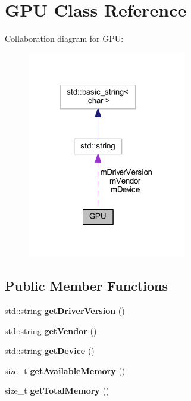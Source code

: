 \hypertarget{class_g_p_u}{}\section{G\+PU Class Reference}
\label{class_g_p_u}


Collaboration diagram for G\+PU\+:
\nopagebreak
\begin{figure}[H]
\begin{center}
\leavevmode
\includegraphics[width=197pt]{class_g_p_u__coll__graph}
\end{center}
\end{figure}
\subsection*{Public Member Functions}
\begin{DoxyCompactItemize}
\item 
std\+::string {\bfseries get\+Driver\+Version} ()\hypertarget{class_g_p_u_ae92cd8553e3017952372f0d9a0a0a6aa}{}\label{class_g_p_u_ae92cd8553e3017952372f0d9a0a0a6aa}

\item 
std\+::string {\bfseries get\+Vendor} ()\hypertarget{class_g_p_u_a7f302d02f8828a87659706ac6ea7e2ce}{}\label{class_g_p_u_a7f302d02f8828a87659706ac6ea7e2ce}

\item 
std\+::string {\bfseries get\+Device} ()\hypertarget{class_g_p_u_ac4814898ff4886efbb19c1136c438e9b}{}\label{class_g_p_u_ac4814898ff4886efbb19c1136c438e9b}

\item 
size\+\_\+t {\bfseries get\+Available\+Memory} ()\hypertarget{class_g_p_u_a49b8fa7e391cf16dbae0f9b17841eff3}{}\label{class_g_p_u_a49b8fa7e391cf16dbae0f9b17841eff3}

\item 
size\+\_\+t {\bfseries get\+Total\+Memory} ()\hypertarget{class_g_p_u_acab8ea6309c537472ff8eceb58e4bcc0}{}\label{class_g_p_u_acab8ea6309c537472ff8eceb58e4bcc0}

\end{DoxyCompactItemize}
